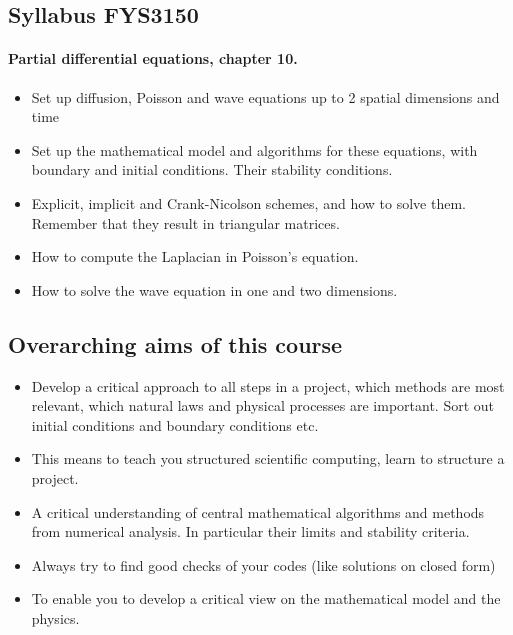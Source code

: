 \documentclass[%
oneside,                 %
final,                   %
10pt]{article}
\begin{document}
\noindent




\subsection{Syllabus FYS3150}


\paragraph{Partial differential equations, chapter 10.}
\begin{itemize}
  \item Set up diffusion, Poisson and wave equations up to 2 spatial dimensions and time

  \item Set up the mathematical model and algorithms for these equations, with boundary and initial conditions. Their stability conditions.

  \item Explicit, implicit and Crank-Nicolson schemes, and how to solve them. Remember that they result in triangular matrices.

  \item How to compute the Laplacian in Poisson's equation.

  \item How to solve the wave equation in one and two dimensions.
\end{itemize}

\noindent




\subsection{Overarching aims of this course}

\begin{itemize}
  \item Develop a critical approach to all steps in a project, which methods are most relevant, which natural laws and physical processes are important. Sort out initial conditions and boundary conditions etc.

  \item This means to teach you structured scientific computing, learn to structure a project.

  \item A critical understanding of central mathematical algorithms and methods from numerical analysis. In particular their limits and stability criteria.

  \item Always try to find good checks of your codes (like solutions on closed form)

  \item To enable you to develop a critical view on the mathematical model and the physics.
\end{itemize}
\end{document}
